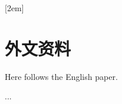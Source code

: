 
[2em]{\vspace{.5\baselineskip}\xiaosan\song}%
             {\prechaptername\CJKnumber{\thecontentslabel}\postchaptername\qquad}{} %
             {}             %
\chapter*{外文资料}

Here follows the English paper.

...
\thispagestyle{empty}